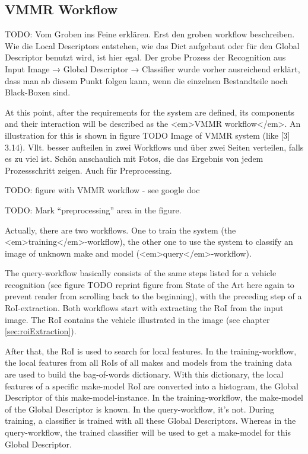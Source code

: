 \subsection{VMMR Workflow}
TODO: Vom Groben ins Feine erklären. Erst den groben workflow beschreiben. Wie die Local Descriptors entstehen, wie das Dict aufgebaut oder für den Global Descriptor benutzt wird, ist hier egal. Der grobe Prozess der Recognition aus Input Image → Global Descriptor → Classifier wurde vorher ausreichend erklärt, dass man ab diesem Punkt folgen kann, wenn die einzelnen Bestandteile noch Black-Boxen sind.

At this point, after the requirements for the system are defined, its components and their interaction will be described as the <em>VMMR workflow</em>. An illustration for this is shown in figure TODO Image of VMMR system (like [3] 3.14). Vllt. besser aufteilen in zwei Workflows und über zwei Seiten verteilen, falls es zu viel ist. Schön anschaulich mit Fotos, die das Ergebnis von jedem Prozessschritt zeigen. Auch für Preprocessing.

TODO: figure with VMMR workflow - see google doc

TODO: Mark “preprocessing” area in the figure.

Actually, there are two workflows. One to train the system (the <em>training</em>-workflow), the other one to use the system to classify an image of unknown make and model (<em>query</em>-workflow).

The query-workflow basically consists of the same steps listed for a vehicle recognition (see figure TODO reprint figure from State of the Art here again to prevent reader from scrolling back to the beginning), with the preceding step of a RoI-extraction. Both workflows start with extracting the RoI from the input image. The RoI contains the vehicle illustrated in the image (see chapter \ref{sec:roiExtraction}).

After that, the RoI is used to search for local features. In the training-workflow, the local features from all RoIs of all makes and models from the training data are used to build the bag-of-words dictionary. With this dictionary, the local features of a specific make-model RoI are converted into a histogram, the Global Descriptor of this make-model-instance. In the training-workflow, the make-model of the Global Descriptor is known. In the query-workflow, it’s not.
During training, a classifier is trained with all these Global Descriptors. Whereas in the query-workflow, the trained classifier will be used to get a make-model for this Global Descriptor.

